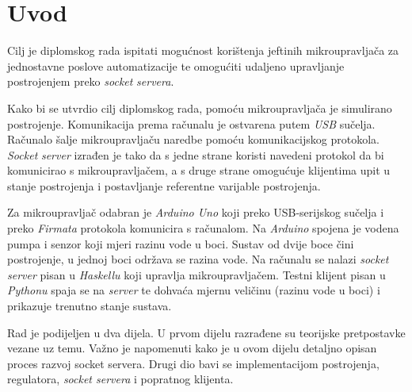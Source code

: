 \setcounter{page}{1}

\chapter{Uvod} \label{introduction}

Cilj je diplomskog rada ispitati mogućnost korištenja jeftinih mikroupravljača
za jednostavne poslove automatizacije te omogućiti udaljeno upravljanje
postrojenjem preko \emph{socket} \emph{servera}.

Kako bi se utvrdio cilj diplomskog rada, pomoću mikroupravljača je simulirano
postrojenje. Komunikacija prema računalu je ostvarena putem \emph{USB}
sučelja. Računalo šalje mikroupravljaču naredbe pomoću komunikacijskog
protokola. \emph{Socket} \emph{server} izrađen je tako da s jedne strane koristi
navedeni protokol da bi komunicirao s mikroupravljačem, a s druge strane
omogućuje klijentima upit u stanje postrojenja i postavljanje referentne
varijable postrojenja.

Za mikroupravljač odabran je \emph{Arduino Uno} koji preko USB-serijskog sučelja
i preko \emph{Firmata} protokola komunicira s računalom. Na \emph{Arduino}
spojena je vodena pumpa i senzor koji mjeri razinu vode u boci. Sustav od dvije
boce čini postrojenje, u jednoj boci održava se razina vode. Na računalu se
nalazi \emph{socket} \emph{server} pisan u \emph{Haskellu} koji upravlja
mikroupravljačem. Testni klijent pisan u \emph{Pythonu} spaja se na
\emph{server} te dohvaća mjernu veličinu (razinu vode u boci) i prikazuje
trenutno stanje sustava.

Rad je podijeljen u dva dijela. U prvom dijelu razrađene su teorijske
pretpostavke vezane uz temu. Važno je napomenuti kako je u ovom dijelu detaljno
opisan proces razvoj socket servera. Drugi dio bavi se implementacijom
postrojenja, regulatora, \emph{socket servera} i popratnog klijenta.
